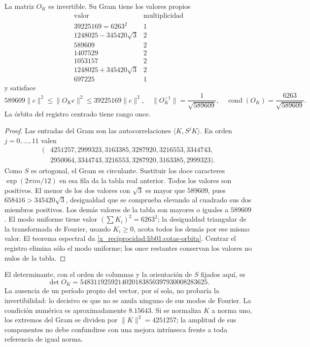\begin{theorem}
\label{x_reciprocidad:lib01:marco-ciclico}
La matriz \(O_K\) es invertible. Su Gram tiene los valores propios
\[
\begin{array}{c|c}
 \text{valor}&\text{multiplicidad}\\\hline
 39225169=6263^2&1\\
 1248025-345420\sqrt3&2\\
 589609&2\\
 1407529&2\\
 1053157&2\\
 1248025+345420\sqrt3&2\\
 697225&1
\end{array}
\]
y satisface
\begin{equation}
 589609\|c\|^2\leq\|O_Kc\|^2\leq39225169\|c\|^2,
 \quad
 \|O_K^{-1}\|=\frac1{\sqrt{589609}},\quad
 \operatorname{cond}(O_K)=\frac{6263}{\sqrt{589609}}.
 \label{x_reciprocidad:lib01:cotas-orbita}
\end{equation}
La órbita del registro centrado tiene rango once.
\end{theorem}
\begin{proof}
Las entradas del Gram son las autocorrelaciones
\(\langle K,S^jK\rangle\). En orden \(j=0,\ldots,11\) valen
\begin{align*}
 (&4251257,2999323,3163385,3287920,3216553,3344743,\\
  &2950064,3344743,3216553,3287920,3163385,2999323).
\end{align*}
Como \(S\) es ortogonal, el Gram es circulante. Sustituir los doce
caracteres \(\exp(2\pi i m/12)\) en esa fila da la tabla real
anterior. Todos los valores son positivos. El menor de los dos valores
con \(\sqrt3\) es mayor que \(589609\), pues
\(658416>345420\sqrt3\), desigualdad que se comprueba elevando al
cuadrado sus dos miembros positivos. Los demás valores de la tabla son
mayores o iguales a \(589609\). El modo uniforme tiene valor
\((\sum K_i)^2=6263^2\); la desigualdad triangular de la transformada
de Fourier, usando \(K_i\geq0\), acota todos los demás por ese mismo
valor. El teorema espectral da \eqref{x_reciprocidad:lib01:cotas-orbita}. Centrar
el registro elimina sólo el modo uniforme; los once restantes conservan
los valores no nulos de la tabla.
\end{proof}

El determinante, con el orden de columnas y la orientación de \(S\)
fijados aquí, es
\[
 \det O_K=5483119259214020183850397930008283625.
\]
La ausencia de un período propio del vector, por sí sola, no probaría la
invertibilidad: lo decisivo es que no se anula ninguno de sus modos de
Fourier. La condición numérica es aproximadamente \(8.15643\). Si se
normaliza \(K\) a norma uno, los extremos del Gram se dividen por
\(\|K\|^2=4251257\); la amplitud de sus componentes no debe
confundirse con una mejora intrínseca frente a toda referencia de igual
norma.

